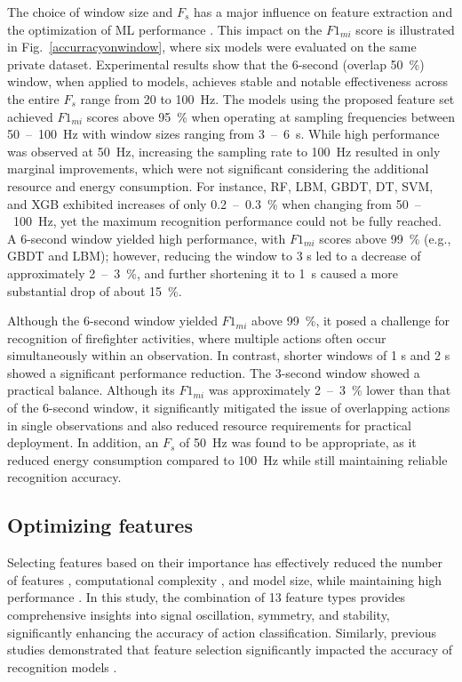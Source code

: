 \documentclass[journal,twoside,web]{ieeecolor}
\begin{document}
The choice of window size and $F_s$ has a major influence on feature extraction and the optimization of ML performance \cite{frequency_window_2021}. This impact on the $F1_{mi}$ score is illustrated in Fig.~\ref{accurracyonwindow}, where six models were evaluated on the same private dataset. Experimental results show that the 6-second (overlap 50~\%) window, when applied to models, achieves stable and notable effectiveness across the entire $F_s$ range from 20 to 100~Hz. The models using the proposed feature set achieved $F1_{mi}$ scores above 95~\% when operating at sampling frequencies between 50~--~100~Hz with window sizes ranging from 3~--~6~s. While high performance was observed at 50~Hz, increasing the sampling rate to 100~Hz resulted in only marginal improvements, which were not significant considering the additional resource and energy consumption. For instance, RF, LBM, GBDT, DT, SVM, and XGB exhibited increases of only 0.2~--~0.3~\% when changing from 50~--~100~Hz, yet the maximum recognition performance could not be fully reached. A 6-second window yielded high performance, with $F1_{mi}$ scores above 99~\% (e.g., GBDT and LBM); however, reducing the window to 3 s led to a decrease of approximately 2~--~3~\%, and further shortening it to 1~s caused a more substantial drop of about 15~\%.

Although the 6-second window yielded $F1_{mi}$ above 99~\%, it posed a challenge for recognition of firefighter activities, where multiple actions often occur simultaneously within an observation. In contrast, shorter windows of 1 s and 2 s showed a significant performance reduction. The 3-second window showed a practical balance. Although its $F1_{mi}$ was approximately 2~--~3~\% lower than that of the 6-second window, it significantly mitigated the issue of overlapping actions in single observations and also reduced resource requirements for practical deployment. In addition, an $F_s$ of 50~Hz was found to be appropriate, as it reduced energy consumption compared to 100~Hz while still maintaining reliable recognition accuracy.


\subsection{Optimizing features}

Selecting features based on their importance has effectively reduced the number of features \cite{featureSelection2021,ImportandFeature2023}, computational complexity \cite{ViManhTuyen2024,HongNhung2023}, and model size, while maintaining high performance \cite{DaoHieu2022,Thu2022}. In this study, the combination of 13 feature types provides comprehensive insights into signal oscillation, symmetry, and stability, significantly enhancing the accuracy of action classification. Similarly, previous studies demonstrated that feature selection significantly impacted the accuracy of recognition models \cite{CHAI_FIRE2024,Lu2020,Wang2018}.
\end{document}
